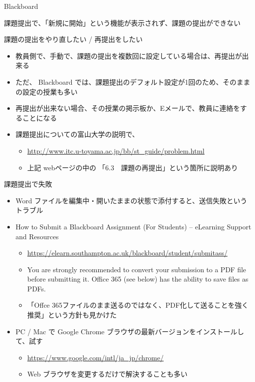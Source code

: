 \documentclass[a4j,10pt]{jsarticle}
\begin{document}
{\begin{frame}[label={sec:orgc119bb0},fragile]{Blackboard}
\begin{block}{課題提出で、「新規に開始」という機能が表示されず、課題の提出ができない}
\end{block}
\par
\begin{block}{課題の提出をやり直したい / 再提出をしたい}
\begin{itemize}
\item 教員側で、手動で、課題の提出を複数回に設定している場合は、再提出が出来る
\item ただ、 Blackboard では、課題提出のデフォルト設定が1回のため、そのままの設定の授業も多い
\item 再提出が出来ない場合、その授業の掲示板か、Eメールで、教員に連絡をすることになる
\item 課題提出についての富山大学の説明で、
\begin{itemize}
\item \url{http://www.itc.u-toyama.ac.jp/bb/st\_guide/problem.html}
\item 上記 webページの中の 「6.3　課題の再提出」という箇所に説明あり
\end{itemize}
\end{itemize}
\end{block}
\par
\begin{block}{課題提出で失敗}
\begin{itemize}
\item Word ファイルを編集中・開いたままの状態で添付すると、送信失敗というトラブル
\par
\item How to Submit a Blackboard Assignment (For Students) – eLearning Support and Resources
\begin{itemize}
\item \url{https://elearn.southampton.ac.uk/blackboard/student/submitass/}
\item You are strongly recommended to convert your submission to a PDF file before submitting it.
Office 365 (see below) has the ability to save files as PDFs.
\item 「Offce 365ファイルのまま送るのではなく、PDF化して送ることを強く推奨」という方針も見かけた
\end{itemize}
\par
\item PC / Mac で Google Chrome ブラウザの最新バージョンをインストールして、試す
\begin{itemize}
\item \url{https://www.google.com/intl/ja\_jp/chrome/}
\item Web ブラウザを変更するだけで解決することも多い
\end{itemize}

\end{itemize}
\end{block}
\end{frame}}
\end{document}
